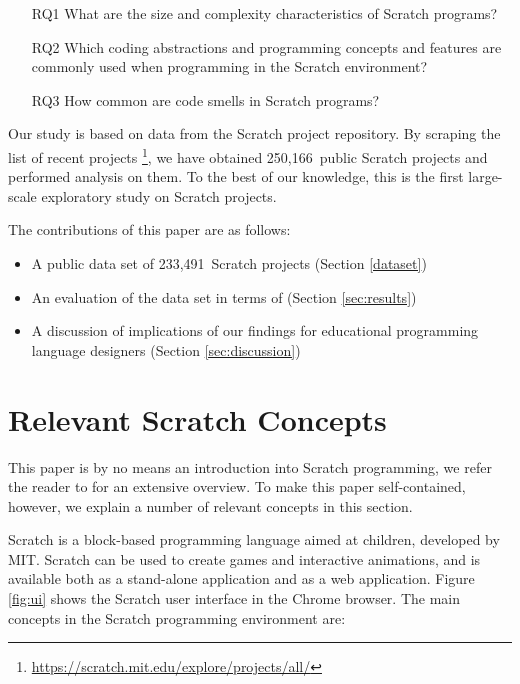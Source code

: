 \documentclass{sig-alternate}
\newcommand{\nPrograms}{250,166}
\newcommand{\nScriptPrograms}{233,491}
\begin{document}
\begin{itemize}
\item[RQ1] What are the size and complexity characteristics of Scratch programs?
\item[RQ2] Which coding abstractions and programming concepts and features are commonly used when programming in the Scratch environment?
\item[RQ3] How common are code smells in Scratch programs?
\end{itemize}

Our study is based on data from the Scratch project repository. By scraping the list of recent projects \footnote{\url{https://scratch.mit.edu/explore/projects/all/}}, we have obtained \nPrograms~public Scratch projects and performed analysis on them. To the best of our knowledge, this is the first large-scale exploratory study on Scratch projects.

The contributions of this paper are as follows:

\begin{itemize}
	\item{A public data set of \nScriptPrograms~Scratch projects (Section \ref{dataset})}
	\item{An evaluation of the data set in terms of (Section \ref{sec:results})}
	\item{A discussion of implications of our findings for educational programming language designers (Section \ref{sec:discussion})}
\end{itemize}

\section{Relevant Scratch Concepts}
\label{sec:scratch}
This paper is by no means an introduction into Scratch programming, we refer the reader to \cite{brennan_creative_2014} for an extensive overview. To make this paper self-contained, however, we explain a number of relevant concepts in this section. 

Scratch is a block-based programming language aimed at children, developed by MIT. Scratch can be used to create games and interactive animations, and is available both as a stand-alone application and as a web application. Figure \ref{fig:ui} shows the Scratch user interface in the Chrome browser. The main concepts in the Scratch programming environment are:
\end{document}
